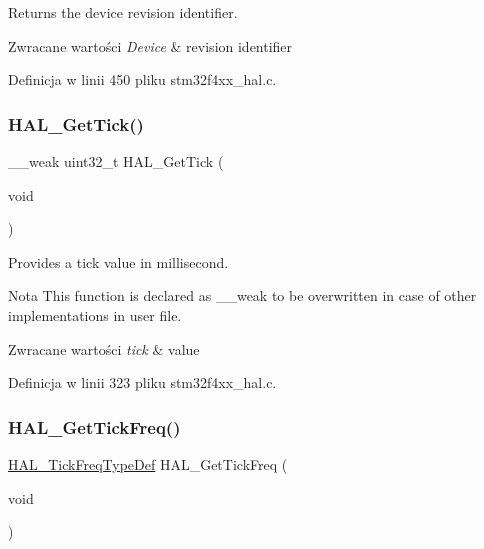 Returns the device revision identifier. 


\begin{DoxyRetVals}{Zwracane wartości}
{\em Device} & revision identifier \\
\hline
\end{DoxyRetVals}


Definicja w linii 450 pliku stm32f4xx\+\_\+hal.\+c.

\mbox{\label{group___h_a_l___exported___functions___group2_gac9b3a85a73735ac840d0dcb59bc0fdd6}} 
\subsubsection{\texorpdfstring{H\+A\+L\+\_\+\+Get\+Tick()}{HAL\_GetTick()}}
{\footnotesize\ttfamily \+\_\+\+\_\+weak uint32\+\_\+t H\+A\+L\+\_\+\+Get\+Tick (\begin{DoxyParamCaption}\item[{void}]{ }\end{DoxyParamCaption})}



Provides a tick value in millisecond. 

\begin{DoxyNote}{Nota}
This function is declared as \+\_\+\+\_\+weak to be overwritten in case of other implementations in user file. 
\end{DoxyNote}

\begin{DoxyRetVals}{Zwracane wartości}
{\em tick} & value \\
\hline
\end{DoxyRetVals}


Definicja w linii 323 pliku stm32f4xx\+\_\+hal.\+c.

\mbox{\label{group___h_a_l___exported___functions___group2_ga803cdbcc0883bcf5f5c98c50024c97e6}} 
\subsubsection{\texorpdfstring{H\+A\+L\+\_\+\+Get\+Tick\+Freq()}{HAL\_GetTickFreq()}}
{\footnotesize\ttfamily \hyperlink{group___h_a_l___t_i_c_k___f_r_e_q_gab36ec81674817249c46734772ff3b73a}{H\+A\+L\+\_\+\+Tick\+Freq\+Type\+Def} H\+A\+L\+\_\+\+Get\+Tick\+Freq (\begin{DoxyParamCaption}\item[{void}]{ }\end{DoxyParamCaption})}



